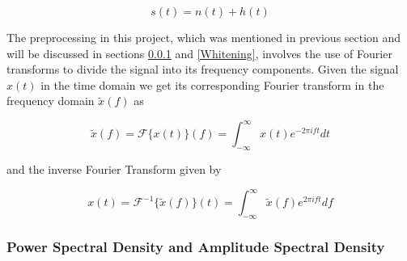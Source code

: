 \documentclass[12pt]{article}
\begin{document}
\begin{equation}
    s(t) = n(t) + h(t)
    \label{eq:strain_output}
\end{equation}

\medskip
\noindent The preprocessing in this project, which was mentioned in previous section and will be discussed in sections \ref{PSD_ASD} and \ref{Whitening}, involves the use of Fourier transforms to divide the signal into its frequency components. Given the signal $x(t)$ in the time domain we get its corresponding Fourier transform in the frequency domain $\tilde{x}(f)$ as

\begin{equation}
    \tilde{x}(f) = \mathcal{F}\{ x(t) \} (f) = \int_{-\infty}^{\infty} x(t) e^{-2 \pi i f t} dt
    \label{eq:fourier_transform}
\end{equation}

\medskip
\noindent and the inverse Fourier Transform given by

\begin{equation}
  x(t) = \mathcal{F}^{-1} \{ \tilde{x}(f) \} (t) = \int_{-\infty}^{\infty} \tilde{x}(f) e^{2 \pi i f t} df
  \label{eq:inverse_fourier_transform}
\end{equation}

\subsubsection{Power Spectral Density and Amplitude Spectral Density}\label{PSD_ASD}



\end{document}
